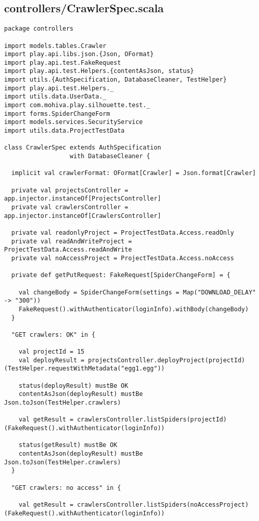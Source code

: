 \subsection{controllers/CrawlerSpec.scala}
\begin{lstlisting}
package controllers

import models.tables.Crawler
import play.api.libs.json.{Json, OFormat}
import play.api.test.FakeRequest
import play.api.test.Helpers.{contentAsJson, status}
import utils.{AuthSpecification, DatabaseCleaner, TestHelper}
import play.api.test.Helpers._
import utils.data.UserData._
import com.mohiva.play.silhouette.test._
import forms.SpiderChangeForm
import models.services.SecurityService
import utils.data.ProjectTestData

class CrawlerSpec extends AuthSpecification
                  with DatabaseCleaner {

  implicit val crawlerFormat: OFormat[Crawler] = Json.format[Crawler]

  private val projectsController = app.injector.instanceOf[ProjectsController]
  private val crawlersController = app.injector.instanceOf[CrawlersController]

  private val readonlyProject = ProjectTestData.Access.readOnly
  private val readAndWriteProject = ProjectTestData.Access.readAndWrite
  private val noAccessProject = ProjectTestData.Access.noAccess

  private def getPutRequest: FakeRequest[SpiderChangeForm] = {

    val changeBody = SpiderChangeForm(settings = Map("DOWNLOAD_DELAY" -> "300"))
    FakeRequest().withAuthenticator(loginInfo).withBody(changeBody)
  }

  "GET crawlers: OK" in {

    val projectId = 15
    val deployResult = projectsController.deployProject(projectId)(TestHelper.requestWithMetadata("egg1.egg"))

    status(deployResult) mustBe OK
    contentAsJson(deployResult) mustBe Json.toJson(TestHelper.crawlers)

    val getResult = crawlersController.listSpiders(projectId)(FakeRequest().withAuthenticator(loginInfo))

    status(getResult) mustBe OK
    contentAsJson(deployResult) mustBe Json.toJson(TestHelper.crawlers)
  }

  "GET crawlers: no access" in {

    val getResult = crawlersController.listSpiders(noAccessProject)(FakeRequest().withAuthenticator(loginInfo))


\end{lstlisting}

